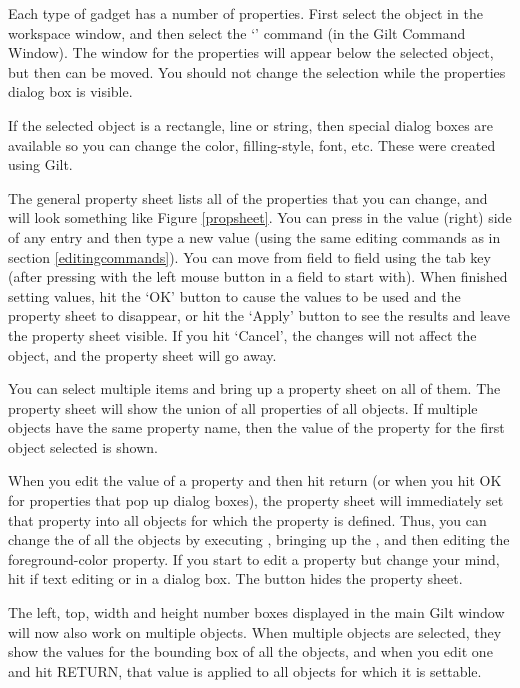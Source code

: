 Each type of gadget has a number of properties.
First select the object in the workspace window, and then select the
`' command (in the Gilt Command Window).
The window for the properties will appear below the selected object, but then
can be moved.  You should not change the selection while the
properties dialog box is visible.

If the selected object is a rectangle,
line or string, then special dialog boxes are available so you can
change the color, filling-style, font, etc.  These were created using Gilt.

The general property sheet lists all of the
properties that you can change, and will look something like Figure
\ref{propsheet}.  You can press in the value (right) side of any entry
and then type a new value (using the same editing commands as in
section \ref{editingcommands}).  You can move from field to field
using the tab key (after pressing with the left mouse button in a
field to start with).  When finished setting values, hit the `OK'
button to cause the values to be used and the property sheet to
disappear, or hit the `Apply' button to see the results and leave the
property sheet visible.  If you hit `Cancel', the changes will not
affect the object, and the property sheet will go away.

You can select multiple items and bring
up a property sheet on all of them.  The property sheet will show the
union of all properties of all objects.  If multiple objects have the
same property name, then the value of the property for the first
object selected is shown.

When you edit the value of a property and then hit return (or when you
hit OK for properties that pop up dialog boxes), the property sheet
will immediately set that property into all objects for which the
property is defined.  Thus, you can change the 
of all the objects by executing , bringing up the
, and then editing the foreground-color property.
If you start to edit a property but change your mind, hit
 if text editing or  in a dialog box.  The
 button hides the property sheet.

The left, top, width and height number boxes displayed in the main
Gilt window will now also work on multiple objects.   When multiple
objects are selected, they show the values for the bounding box of all
the objects, and when you edit one and hit RETURN, that value is
applied to all objects for which it is settable.

